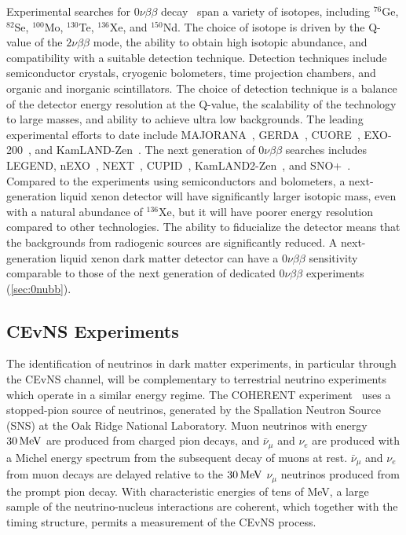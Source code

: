Experimental searches for $0\nu\beta\beta$ decay~\cite{DellOro:2016tmg} span a variety of isotopes, including $^{76}$Ge, $^{82}$Se, $^{100}$Mo, $^{130}$Te, $^{136}$Xe, and $^{150}$Nd. The choice of isotope is driven by the Q-value of the $2\nu\beta\beta$ mode, the ability to obtain high isotopic abundance, and compatibility with a suitable detection technique. Detection techniques include semiconductor crystals, cryogenic bolometers, time projection chambers, and organic and inorganic scintillators. The choice of detection technique is a balance of the detector energy resolution at the Q-value, the scalability of the technology to large masses, and ability to achieve ultra low backgrounds. The leading experimental efforts to date include MAJORANA~\cite{Alvis:2019sil}, GERDA~\cite{Agostini:2019hzm}, CUORE~\cite{Adams:2019jhp}, EXO-200~\cite{Anton:2019wmi}, and KamLAND-Zen~\cite{KamLAND-Zen:2016pfg, Gando:2020cxo}. The next generation of $0\nu\beta\beta$ searches includes LEGEND\cite{Abgrall:2017syy}, nEXO~\cite{Albert:2017hjq}, NEXT~\cite{Adams:2020cye}, CUPID~\cite{CUPIDInterestGroup:2019inu}, KamLAND2-Zen~\cite{Nakamura:2020szx}, and SNO+~\cite{Andringa:2015tza}. Compared to the experiments using semiconductors and bolometers, a next-generation liquid xenon detector will have significantly larger isotopic mass, even with a natural abundance of $^{136}$Xe, but it will have poorer energy resolution compared to other technologies. The ability to fiducialize the detector means that the backgrounds from radiogenic sources are significantly reduced. A next-generation liquid xenon dark matter detector can have a $0\nu\beta\beta$ sensitivity comparable to those of the next generation of dedicated $0\nu\beta\beta$ experiments (\autoref{sec:0nubb}). 

\subsection{CEvNS Experiments}

The identification of neutrinos in dark matter experiments, in particular through the CEvNS channel, will be complementary to terrestrial neutrino experiments which operate in a similar energy regime. The COHERENT experiment~\cite{Akimov:2018ghi} uses a stopped-pion source of neutrinos, generated by the Spallation Neutron Source (SNS) at the Oak Ridge National Laboratory. Muon neutrinos with energy $30\, \mathrm{MeV}$ are produced from charged pion decays, and $\bar{\nu}_\mu$ and $\nu_e$ are produced with a Michel energy spectrum from the subsequent decay of muons at rest. $\bar{\nu}_\mu$ and $\nu_e$ from muon decays are delayed relative to the $30\, \mathrm{MeV}$ $\nu_\mu$ neutrinos produced from the prompt pion decay. With characteristic energies of tens of MeV, a large sample of the neutrino-nucleus interactions are coherent, which together with the timing structure, permits a measurement of the CEvNS process.

